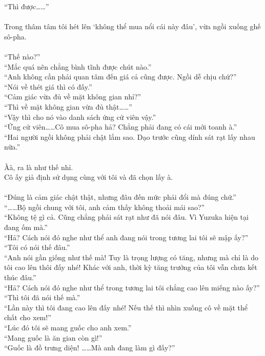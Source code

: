 \documentclass[12pt,a4paper, twosides]{book}
\begin{document}
“Thì được……”\\
\\
Trong thâm tâm tôi hét lên ‘không thể mua nổi cái này đâu’, vừa ngồi xuống ghế sô-pha.\\
\\
“Thế nào?”\\
“Mắc quá nên chẳng bình tĩnh được chút nào.”\\
“Anh không cần phải quan tâm đến giá cả cũng được. Ngồi dễ chịu chứ?”\\
“Nói về thét giá thì có đấy.”\\
“Cảm giác vừa đủ về mặt không gian nhỉ?”\\
“Thì về mặt không gian vừa đủ thật……”\\
“Vậy thì cho nó vào danh sách ứng cử viên vậy.”\\
“Ứng cử viên……Cô mua sô-pha hả? Chẳng phải đang có cái mới toanh à.”\\
“Hai người ngồi không phải chật lắm sao. Dạo trước cũng dính sát rạt lấy nhau nữa.”\\
\\
Àà, ra là như thế nhỉ.\\
Cô ấy giả định sử dụng cùng với tôi và đã chọn lấy à.\\
\\
“Đúng là cảm giác chật thật, nhưng đâu đến mức phải đổi mà đúng chứ.”\\
“……Bộ ngồi chung với tôi, anh cảm thấy không thoải mái sao?”\\
“Không tệ gì cả. Cũng chẳng phải sát rạt như đã nói đâu. Vì Yuzuka hiện tại đang ốm mà.”\\
“Hả? Cách nói đó nghe như thể anh đang nói trong tương lai tôi sẽ mập ấy?”\\
“Tôi có nói thế đâu.”\\
“Anh nói gần giống như thế mà! Tuy là trọng lượng có tăng, nhưng mà chỉ là do tôi cao lên thôi đấy nhé! Khác với anh, thời kỳ tăng trưởng của tôi vẫn chưa kết thúc đâu.”\\
“Hả? Cách nói đó nghe như thể trong tương lai tôi chẳng cao lên miếng nào ấy?”\\
“Thì tôi đã nói thế mà.”\\
“Lần này thì tôi đang cao lên đấy nhé! Nếu thế thì nhìn xuống cô về mặt thể chất cho xem!”\\
“Lúc đó tôi sẽ mang guốc cho anh xem.”\\
“Mang guốc là ăn gian còn gì!”\\
“Guốc là đồ trưng diện! ……Mà anh đang làm gì đấy?”\\
\end{document}
